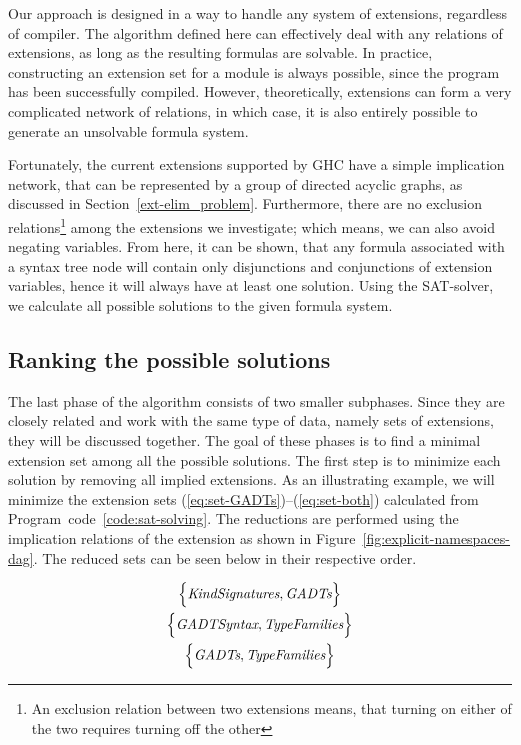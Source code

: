 \documentclass[main.tex]{subfiles}
\begin{document}
	Our approach is designed in a way to handle any system of extensions, regardless of compiler. The algorithm defined here can effectively deal with any relations of extensions, as long as the resulting formulas are solvable. In practice, constructing an extension set for a module is always possible, since the program has been successfully compiled. However, theoretically, extensions can form a very complicated network of relations, in which case, it is also entirely possible to generate an unsolvable formula system. %
	
	Fortunately, the current extensions supported by GHC have a simple implication network, that can be represented by a group of directed acyclic graphs, as discussed in Section~\ref{ext-elim_problem}. Furthermore, there are no exclusion relations\footnote{An exclusion relation between two extensions means, that turning on either of the two requires turning off the other} among the extensions we investigate; which means, we can also avoid negating variables. From here, it can be shown, that any formula associated with a syntax tree node will contain only disjunctions and conjunctions of extension variables, hence it will always have at least one solution. Using the SAT-solver, we calculate all possible solutions to the given formula system.
	
	\subsection{Ranking the possible solutions} \label{ranking-solutions}
	
	The last phase of the algorithm consists of two smaller subphases. Since they are closely related and work with the same type of data, namely sets of extensions, they will be discussed together.	The goal of these phases is to find a minimal extension set among all the possible solutions. The first step is to minimize each solution by removing all implied extensions. As an illustrating example, we will minimize the extension sets (\ref{eq:set-GADTs})--(\ref{eq:set-both}) calculated from Program~code~\ref{code:sat-solving}. The reductions are performed using the implication relations of the extension as shown in Figure~\ref{fig:explicit-namespaces-dag}. The reduced sets can be seen below in their respective order.
	
	\begin{gather}
		\Big\{ \textit{KindSignatures}, \textit{GADTs} \Big\} \label{eq:reduced-set-GADTs} \\
		\Big\{ \textit{GADTSyntax}, \textit{TypeFamilies} \Big\} \label{eq:reduced-set-TypeFamilies} \\
		\Big\{ \textit{GADTs}, \textit{TypeFamilies} \Big\} \label{eq:reduced-set-both}
	\end{gather}
	
\end{document}
